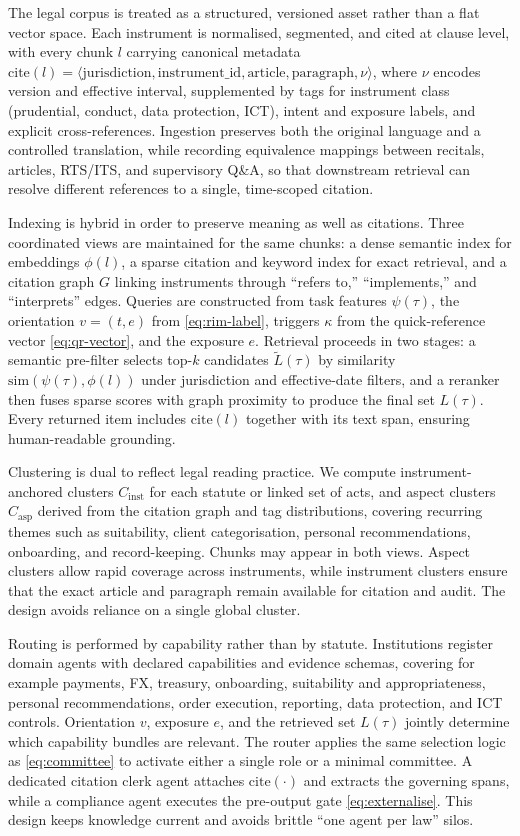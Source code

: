 \documentclass[oneside,10pt]{swissi}
\begin{document}
The legal corpus is treated as a structured, versioned asset rather than a flat vector space. Each instrument is normalised, segmented, and cited at clause level, with every chunk \(l\) carrying canonical metadata \(\mathrm{cite}(l)=\langle\text{jurisdiction},\text{instrument\_id},\text{article},\text{paragraph},\nu\rangle\), where \(\nu\) encodes version and effective interval, supplemented by tags for instrument class (prudential, conduct, data protection, ICT), intent and exposure labels, and explicit cross-references. Ingestion preserves both the original language and a controlled translation, while recording equivalence mappings between recitals, articles, RTS/ITS, and supervisory Q\&A, so that downstream retrieval can resolve different references to a single, time-scoped citation.

Indexing is hybrid in order to preserve meaning as well as citations. Three coordinated views are maintained for the same chunks: a dense semantic index for embeddings \(\phi(l)\), a sparse citation and keyword index for exact retrieval, and a citation graph \(G\) linking instruments through “refers to,” “implements,” and “interprets” edges. Queries are constructed from task features \(\psi(\tau)\), the orientation \(v=(t,e)\) from \eqref{eq:rim-label}, triggers \(\kappa\) from the quick-reference vector \eqref{eq:qr-vector}, and the exposure \(e\). Retrieval proceeds in two stages: a semantic pre-filter selects top-\(k\) candidates \(\tilde L(\tau)\) by similarity \(\mathrm{sim}(\psi(\tau),\phi(l))\) under jurisdiction and effective-date filters, and a reranker then fuses sparse scores with graph proximity to produce the final set \(L(\tau)\). Every returned item includes \(\mathrm{cite}(l)\) together with its text span, ensuring human-readable grounding.

Clustering is dual to reflect legal reading practice. We compute instrument-anchored clusters \(C_{\text{inst}}\) for each statute or linked set of acts, and aspect clusters \(C_{\text{asp}}\) derived from the citation graph and tag distributions, covering recurring themes such as suitability, client categorisation, personal recommendations, onboarding, and record-keeping. Chunks may appear in both views. Aspect clusters allow rapid coverage across instruments, while instrument clusters ensure that the exact article and paragraph remain available for citation and audit. The design avoids reliance on a single global cluster.

Routing is performed by capability rather than by statute. Institutions register domain agents with declared capabilities and evidence schemas, covering for example payments, FX, treasury, onboarding, suitability and appropriateness, personal recommendations, order execution, reporting, data protection, and ICT controls. Orientation \(v\), exposure \(e\), and the retrieved set \(L(\tau)\) jointly determine which capability bundles are relevant. The router applies the same selection logic as \eqref{eq:committee} to activate either a single role or a minimal committee. A dedicated citation clerk agent attaches \(\mathrm{cite}(\cdot)\) and extracts the governing spans, while a compliance agent executes the pre-output gate \eqref{eq:externalise}. This design keeps knowledge current and avoids brittle “one agent per law” silos.
\end{document}
